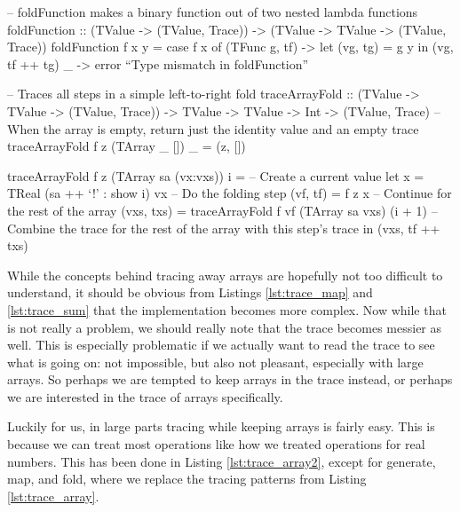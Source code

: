         \begin{haskell}[caption=Tracing array folding, label=lst:trace_fold, gobble=12]
            -- foldFunction makes a binary function out of two nested lambda functions
            foldFunction :: (TValue -> (TValue, Trace))
                -> (TValue -> TValue -> (TValue, Trace))
            foldFunction f x y = case f x of
                (TFunc g, tf) -> let (vg, tg) = g y in (vg, tf ++ tg)
                _             -> error ``Type mismatch in foldFunction''

            -- Traces all steps in a simple left-to-right fold
            traceArrayFold :: (TValue -> TValue -> (TValue, Trace)) -> TValue
                -> TValue -> Int -> (TValue, Trace)
            -- When the array is empty, return just the identity value and an empty trace
            traceArrayFold f z (TArray _  [])       _ = (z, [])

            traceArrayFold f z (TArray sa (vx:vxs)) i =
                    -- Create a current value
                let x          = TReal (sa ++ `!' : show i) vx
                    -- Do the folding step
                    (vf,  tf)  = f z x
                    -- Continue for the rest of the array
                    (vxs, txs) = traceArrayFold f vf (TArray sa vxs) (i + 1)
                    -- Combine the trace for the rest of the array with this step's trace
                in  (vxs, tf ++ txs)
        \end{haskell}

        While the concepts behind tracing away arrays are hopefully not too difficult to understand, it should be obvious from Listings \ref{lst:trace_map} and \ref{lst:trace_sum} that the implementation becomes more complex.
        Now while that is not really a problem, we should really note that the trace becomes messier as well.
        This is especially problematic if we actually want to read the trace to see what is going on: not impossible, but also not pleasant, especially with large arrays.
        So perhaps we are tempted to keep arrays in the trace instead, or perhaps we are interested in the trace of arrays specifically.

        Luckily for us, in large parts tracing while keeping arrays is fairly easy.
        This is because we can treat most operations like how we treated operations for real numbers.
        This has been done in Listing \ref{lst:trace_array2}, except for generate, map, and fold, where we replace the tracing patterns from Listing \ref{lst:trace_array}.

